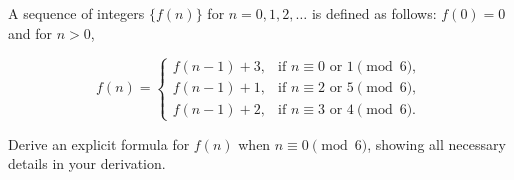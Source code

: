 A sequence of integers $\lbrace f(n) \rbrace$ for $n = 0, 1, 2, \dots$ is
defined as follows: $f(0) = 0$ and for $n > 0$,

$$
f(n) = \begin{cases}
         f(n - 1) + 3, & \text{if } n \equiv 0 \text{ or } 1 \pmod{6}, \\
         f(n - 1) + 1, & \text{if } n \equiv 2 \text{ or } 5 \pmod{6}, \\
         f(n - 1) + 2, & \text{if } n \equiv 3 \text{ or } 4 \pmod{6}.
       \end{cases}
$$

Derive an explicit formula for $f(n)$ when $n \equiv 0 \pmod{6}$, showing all
necessary details in your derivation.
